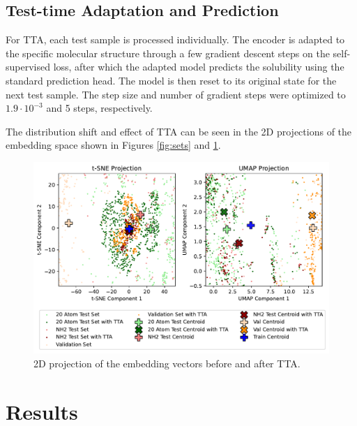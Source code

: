 \documentclass[11pt,a4paper]{article}
\begin{document}
\subsection{Test-time Adaptation and Prediction}

For TTA, each test sample is processed individually. The encoder is adapted to the specific molecular structure through a few gradient descent steps on the self-supervised loss, after which the adapted model predicts the solubility using the standard prediction head. The model is then reset to its original state for the next test sample. The step size and number of gradient steps were optimized to $1.9 \cdot 10^{-3}$ and 5 steps, respectively.

The distribution shift and effect of TTA can be seen in the 2D projections of the embedding space shown in Figures \ref{fig:sets} and \ref{fig:sets_TTA}.

\begin{figure}[htbp]
        \centering
        \includegraphics[width=1\textwidth]{sets_TTA.pdf}
        \caption{2D projection of the embedding vectors before and after TTA.}
        \label{fig:sets_TTA}
\end{figure}

\section{Results}
\end{document}
